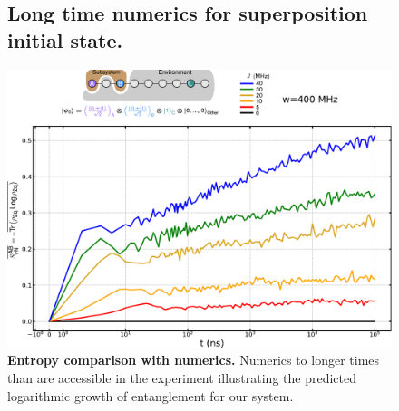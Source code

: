 \begin{figure}
\subsection{Long time numerics for superposition initial state.}
\centering
\includegraphics[width=140mm, keepaspectratio]{./PDF/num_svn_long_time.pdf}
\caption{\textbf{Entropy comparison with numerics.}
Numerics to longer times than are accessible in the experiment illustrating the predicted logarithmic growth of entanglement for our system.
}
\end{figure}

